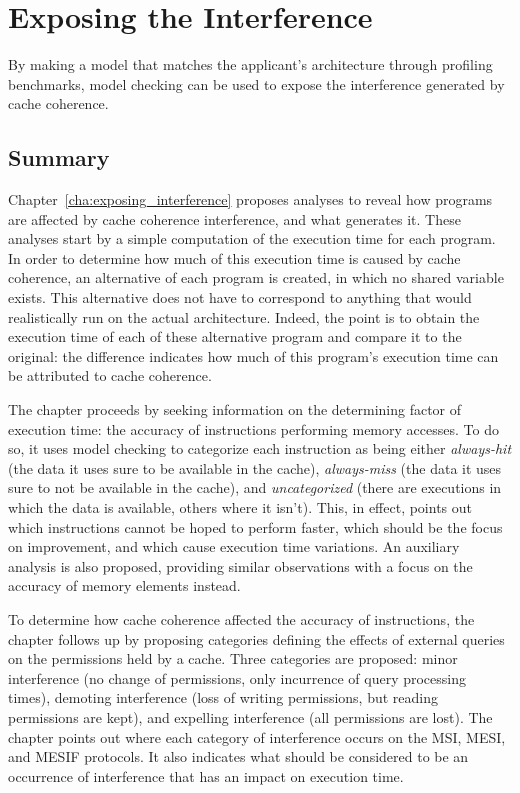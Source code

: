 \section{Exposing the Interference}
By making a model that matches the applicant's architecture through profiling
benchmarks, model checking can be used to expose the interference generated by
cache coherence.

\subsection{Summary}
Chapter~\ref{cha:exposing_interference} proposes analyses to reveal how
programs are affected by cache coherence interference, and what generates it.
These analyses start by a simple computation of the execution time for each
program. In order to determine how much of this execution time is caused by
cache coherence, an alternative of each program is created, in which no shared
variable exists. This alternative does not have to correspond to anything that
would realistically run on the actual architecture. Indeed, the point is to
obtain the execution time of each of these alternative program and compare it
to the original: the difference indicates how much of this program's execution
time can be attributed to cache coherence.

The chapter proceeds by seeking information on the determining factor of
execution time: the accuracy of instructions performing memory accesses. To do
so, it uses model checking to categorize each instruction as being either
\textit{always-hit} (the data it uses sure to be available in the cache),
\textit{always-miss} (the data it uses sure to not be available in the cache),
and \textit{uncategorized} (there are executions in which the data is
available, others where it isn't). This, in effect, points out which
instructions cannot be hoped to perform faster, which should be the focus on
improvement, and which cause execution time variations. An auxiliary analysis
is also proposed, providing similar observations with a focus on the accuracy of
memory elements instead.

To determine how cache coherence affected the accuracy of instructions, the
chapter follows up by proposing categories defining the effects of external
queries on the permissions held by a cache. Three categories are proposed:
minor interference (no change of permissions, only incurrence of query
processing times), demoting interference (loss of writing permissions, but
reading permissions are kept), and expelling interference (all permissions are
lost). The chapter points out where each category of interference occurs on
the MSI, MESI, and MESIF protocols. It also indicates what should be considered
to be an occurrence of interference that has an impact on execution time.

